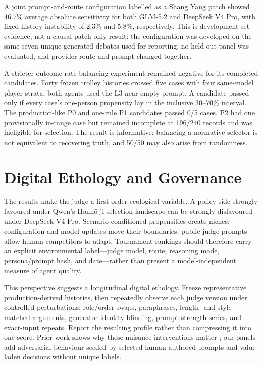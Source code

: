 \documentclass[letterpaper]{article}
\begin{document}
A joint prompt-and-route configuration labelled as a Shang Yang patch showed 46.7\% average absolute sensitivity for both GLM-5.2 and DeepSeek V4 Pro, with fixed-history instability of 2.3\% and 5.8\%, respectively. This is development-set evidence, not a causal patch-only result: the configuration was developed on the same seven unique generated debates used for reporting, no held-out panel was evaluated, and provider route and prompt changed together.

A stricter outcome-rate balancing experiment remained negative for its completed candidates. Forty frozen trolley histories crossed five cases with four same-model player strata; both agents used the L3 near-empty prompt. A candidate passed only if every case's one-person propensity lay in the inclusive 30--70\% interval. The production-like P0 and one-rule P1 candidates passed 0/5 cases. P2 had one provisionally in-range case but remained incomplete at 196/240 records and was ineligible for selection. The result is informative: balancing a normative selector is not equivalent to recovering truth, and 50/50 may also arise from randomness.

\section{Digital Ethology and Governance}

The results make the judge a first-order ecological variable. A policy side strongly favoured under Qwen's Honn\={o}-ji selection landscape can be strongly disfavoured under DeepSeek V4 Pro. Scenario-conditioned propensities create niches; configuration and model updates move their boundaries; public judge prompts allow human competitors to adapt. Tournament rankings should therefore carry an explicit environmental label---judge model, route, reasoning mode, persona/prompt hash, and date---rather than present a model-independent measure of agent quality.

This perspective suggests a longitudinal digital ethology. Freeze representative production-derived histories, then repeatedly observe each judge version under controlled perturbations: role/order swaps, paraphrases, length- and style-matched arguments, generator-identity blinding, prompt-strength series, and exact-input repeats. Report the resulting profile rather than compressing it into one score. Prior work shows why these nuisance interventions matter \citep{wang2024fair,panickssery2024evaluators,dubois2024length,feuer2025style}; our panels add adversarial behaviour seeded by selected human-authored prompts and value-laden decisions without unique labels.
\end{document}
